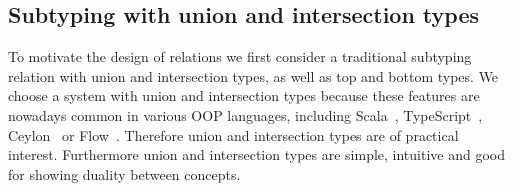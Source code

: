 






\subsection{Subtyping with union and intersection types}
\label{sec:overview:1}

To motivate the design of \nameduo relations we first consider a traditional
subtyping relation with union and intersection types, as well as top
and bottom types. We choose a system with union and intersection types because
these features are nowadays common in various OOP languages, including Scala~\citep{odersky2004overview},
TypeScript~\citep{bierman2014understanding}, Ceylon~\citep{king2013ceylon} or Flow~\citep{chaudhuri2015flow}.
Therefore union and intersection types are of practical interest. Furthermore union and intersection
types are simple, intuitive and good for showing duality between concepts. 

